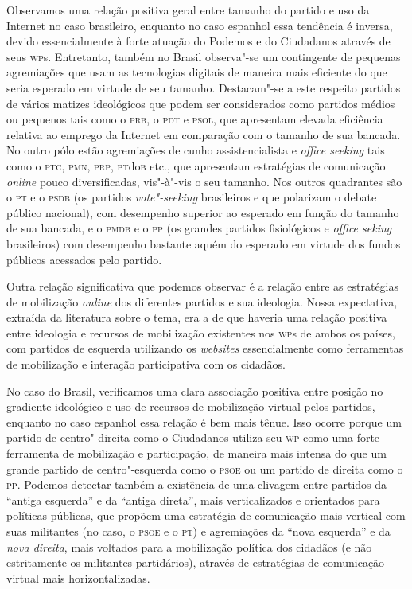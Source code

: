 Observamos uma relação positiva geral
entre tamanho do partido e uso da Internet no caso brasileiro, enquanto
no caso espanhol essa tendência é inversa, devido essencialmente à forte
atuação do Podemos e do Ciudadanos através de seus \textsc{wp}s.
Entretanto, também no Brasil observa"-se um contingente de pequenas
agremiações que usam as tecnologias digitais de maneira mais eficiente
do que seria esperado em virtude de seu tamanho. Destacam"-se a este
respeito partidos de vários matizes ideológicos que podem ser
considerados como partidos médios ou pequenos tais como o \textsc{prb}, o \textsc{pdt} e
\textsc{psol}, que apresentam elevada eficiência relativa ao emprego da Internet
em comparação com o tamanho de sua bancada. No outro pólo estão
agremiações de cunho assistencialista e \textit{office seeking} tais como o
\textsc{ptc}, \textsc{pmn}, \textsc{prp}, \textsc{pt}do\textsc{b} etc., que apresentam estratégias de comunicação
\textit{online} pouco diversificadas, vis"-à"-vis o seu tamanho. Nos outros
quadrantes são o \textsc{pt} e o \textsc{psdb} (os partidos \textit{vote"-seeking} brasileiros e
que polarizam o debate público nacional), com desempenho superior ao
esperado em função do tamanho de sua bancada, e o \textsc{pmdb} e o \textsc{pp} (os
grandes partidos fisiológicos e \textit{office seking} brasileiros) com
desempenho bastante aquém do esperado em virtude dos fundos públicos
acessados pelo partido.

Outra relação significativa que podemos observar é a relação entre as
estratégias de mobilização \textit{online} dos diferentes partidos e sua
ideologia. Nossa expectativa, extraída da literatura sobre o tema, era a
de que haveria uma relação positiva entre ideologia e recursos de
mobilização existentes nos \textsc{wp}s de ambos os países, com partidos de
esquerda utilizando os \textit{websites} essencialmente como ferramentas de
mobilização e interação participativa com os cidadãos.

No caso do Brasil, verificamos uma clara associação positiva
entre posição no gradiente ideológico e uso de recursos de mobilização
virtual pelos partidos, enquanto no caso espanhol essa relação é bem
mais tênue. Isso ocorre porque um partido de centro"-direita como o
Ciudadanos utiliza seu \textsc{wp} como uma forte ferramenta de
mobilização e participação, de maneira mais intensa do que um grande
partido de centro"-esquerda como o \textsc{psoe} ou um partido de direita como o
\textsc{pp}. Podemos detectar também a existência de uma clivagem entre partidos
da ``antiga esquerda'' e da ``antiga direta'', mais verticalizados e
orientados para políticas públicas, que propõem uma estratégia de
comunicação mais vertical com suas militantes (no caso, o \textsc{psoe} e o \textsc{pt}) e
agremiações da ``nova esquerda'' e da \textit{nova direita}, mais voltados
para a mobilização política dos cidadãos (e não estritamente os
militantes partidários), através de estratégias de comunicação virtual
mais horizontalizadas.

